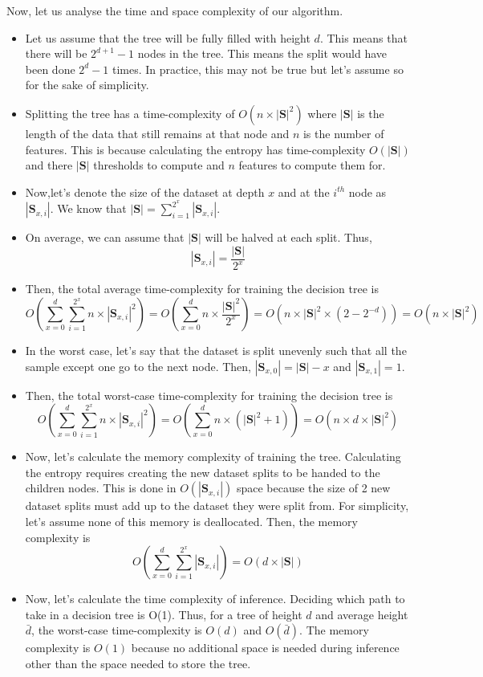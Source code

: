  Now, let us analyse the time and space complexity of our algorithm. 
\begin{itemize}
	\item Let us assume that the tree will be fully filled with height $d$. This means that there will be $2^{d+1}-1$ nodes in the tree. This means the split would have been done $2^{d}-1$ times. In practice, this may not be true but let's assume so for the sake of simplicity.
	\item Splitting the tree has a time-complexity of $O(n\times|\textbf{S}|^2)$ where $|\textbf{S}|$ is the length of the data that still remains at that node and $n$ is the number of features. This is because calculating the entropy has time-complexity $O(|\textbf{S}|)$ and there $|\textbf{S}|$ thresholds to compute and $n$ features to compute them for.
	\item Now,let's denote the size of the dataset at depth $x$ and at the $i^{th}$ node as $|\textbf{S}_{x,i}|$. We know that $|\textbf{S}|=\sum_{i=1}^{2^x}|\textbf{S}_{x,i}|$. 
	\item On average, we can assume that $|\textbf{S}|$ will be halved at each split. Thus,
	$$|\textbf{S}_{x,i}|=\frac{|\textbf{S}|}{2^x}$$
	\item Then, the total average time-complexity for training the decision tree is 
	$$O(\sum_{x=0}^{d}\sum_{i=1}^{2^x}n\times|\textbf{S}_{x,i}|^2)=O(\sum_{x=0}^{d}n\times\frac{|\textbf{S}|^2}{2^x})=O(n\times|\textbf{S}|^2\times(2-2^{-d}))=O(n\times|\textbf{S}|^2)$$
	\item In the worst case, let's say that the dataset is split unevenly such that all the sample except one go to the next node. Then, $|\textbf{S}_{x,0}|=|\textbf{S}|-x$ and $|\textbf{S}_{x,1}|=1$.
	\item Then, the total worst-case time-complexity for training the decision tree is
	$$O(\sum_{x=0}^{d}\sum_{i=1}^{2^x}n\times|\textbf{S}_{x,i}|^2)=O(\sum_{x=0}^{d}n\times(|\textbf{S}|^2+1))=O(n\times d\times|\textbf{S}|^2)$$
	\item Now, let's calculate the memory complexity of training the tree. Calculating the entropy requires creating the new dataset splits to be handed to the children nodes. This is done in $O(|\textbf{S}_{x,i}|)$ space because the size of 2 new dataset splits must add up to the dataset they were split from. For simplicity, let's assume none of this memory is deallocated. Then, the memory complexity is 
	$$O(\sum_{x=0}^{d}\sum_{i=1}^{2^x}|\textbf{S}_{x,i}|)=O(d\times|\textbf{S}|)$$
	\item Now, let's calculate the time complexity of inference. Deciding which path to take in a decision tree is O(1). Thus, for a tree of height $d$ and average height $\bar{d}$, the worst-case time-complexity is $O(d)$ and $O(\bar{d})$. The memory complexity is $O(1)$ because no additional space is needed during inference other than the space needed to store the tree.
\end{itemize}

